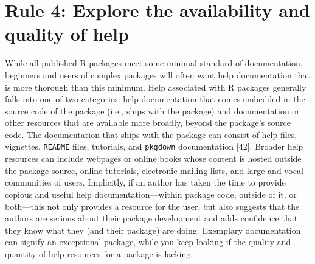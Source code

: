 \documentclass[10pt,letterpaper]{article}
\begin{document}
\hypertarget{rule-4-explore-the-availability-and-quality-of-help}{%
\section{Rule 4: Explore the availability and quality of
help}\label{rule-4-explore-the-availability-and-quality-of-help}}

While all published R packages meet some minimal standard of
documentation, beginners and users of complex packages will often want
help documentation that is more thorough than this minimum. Help
associated with R packages generally falls into one of two categories:
help documentation that comes embedded in the source code of the package
(i.e., ships with the package) and documentation or other resources that
are available more broadly, beyond the package's source code. The
documentation that ships with the package can consist of help files,
vignettes, \texttt{README} files, tutorials, and \texttt{pkgdown}
documentation {[}42{]}. Broader help resources can include webpages or
online books whose content is hosted outside the package source, online
tutorials, electronic mailing lists, and large and vocal communities of
users. Implicitly, if an author has taken the time to provide copious
and useful help documentation---within package code, outside of it, or
both---this not only provides a resource for the user, but also suggests
that the authors are serious about their package development and adds
confidence that they know what they (and their package) are doing.
Exemplary documentation can signify an exceptional package, while you
keep looking if the quality and quantity of help resources for a package
is lacking.
\end{document}
